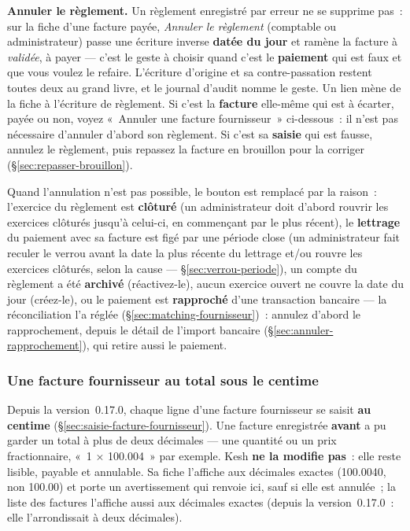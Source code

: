 \documentclass[a4paper,11pt,oneside]{article}
\begin{document}
\textbf{Annuler le règlement.} Un règlement enregistré par erreur ne se supprime pas~: sur la
fiche d'une facture payée, \emph{Annuler le règlement} (comptable ou administrateur) passe une
écriture inverse \textbf{datée du jour} et ramène la facture à \emph{validée}, à payer --- c'est
le geste à choisir quand c'est le \textbf{paiement} qui est faux et que vous voulez le refaire.
L'écriture d'origine et sa contre-passation restent toutes deux au grand livre, et le journal
d'audit nomme le geste. Un lien mène de la fiche à l'écriture de règlement. Si c'est la
\textbf{facture} elle-même qui est à écarter, payée ou non, voyez «~Annuler une facture
fournisseur~» ci-dessous~: il n'est pas nécessaire d'annuler d'abord son règlement. Si c'est
sa \textbf{saisie} qui est fausse, annulez le règlement, puis repassez la facture en brouillon
pour la corriger (\S\ref{sec:repasser-brouillon}).

Quand l'annulation n'est pas possible, le bouton est remplacé par la raison~: l'exercice du
règlement est \textbf{clôturé} (un administrateur doit d'abord rouvrir les exercices clôturés
jusqu'à celui-ci, en commençant par le plus récent), le \textbf{lettrage} du paiement avec sa
facture est figé par une période close (un administrateur fait reculer le verrou avant la date
la plus récente du lettrage et/ou rouvre les exercices clôturés, selon la cause ---
\S\ref{sec:verrou-periode}), un compte du
règlement a été \textbf{archivé} (réactivez-le), aucun exercice ouvert ne couvre la date du
jour (créez-le), ou le paiement est \textbf{rapproché} d'une transaction bancaire --- la
réconciliation l'a réglée (\S\ref{sec:matching-fournisseur})~: annulez d'abord le rapprochement,
depuis le détail de l'import bancaire (\S\ref{sec:annuler-rapprochement}), qui retire aussi le
paiement.

\subsubsection{Une facture fournisseur au total sous le centime}\label{sec:facture-fournisseur-sous-centime}

Depuis la version~0.17.0, chaque ligne d'une facture fournisseur se saisit \textbf{au centime}
(\S\ref{sec:saisie-facture-fournisseur}). Une facture enregistrée \textbf{avant} a pu garder un
total à plus de deux décimales --- une quantité ou un prix fractionnaire, «~1 × 100.004~» par
exemple. Kesh \textbf{ne la modifie pas}~: elle reste lisible, payable et annulable. Sa fiche
l'affiche aux décimales exactes (100.0040, non 100.00) et porte un avertissement qui renvoie
ici, sauf si elle est annulée~; la liste des factures l'affiche aussi aux décimales exactes
(depuis la version~0.17.0~: elle l'arrondissait à deux décimales).
\end{document}
